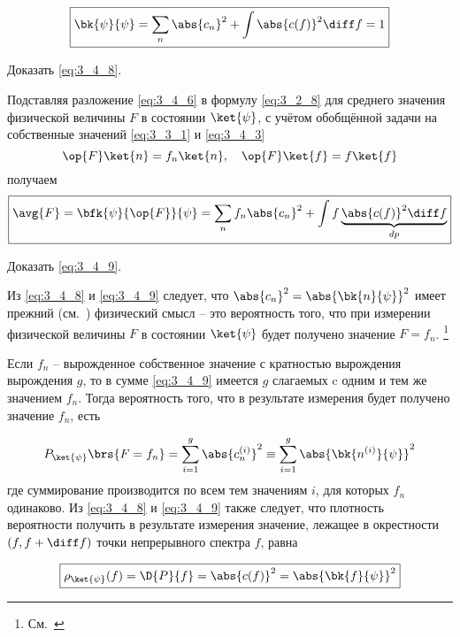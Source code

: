 \begin{equation}
\label{eq:3_4_8}
\boxed {
	\bk{\psi}{\psi} = \sum_n \abs{c_n}^2 + \int \abs{c(f)}^2 \diff f = 1
}
\end{equation}

\begin{excr}
Доказать \eqref{eq:3_4_8}.
\end{excr}


Подставляя разложение \eqref{eq:3_4_6} в формулу \eqref{eq:3_2_8} для среднего значения физической величины $F$ в состоянии $\ket{\psi}$, с учётом обобщённой задачи на собственные значений \eqref{eq:3_3_1} и \eqref{eq:3_4_3}
$$
\op{F} \ket{n} = f_n \ket{n}, ~~~ \op{F} \ket{f} = f \ket{f}
$$%
получаем
\begin{equation}
\label{eq:3_4_9}
\boxed {
	\avg{F} = \bfk{\psi}{\op{F}}{\psi} = \sum_n f_n \abs{c_n}^2 + \int f \underbrace{\abs{c(f)}^2 \diff f}_{dp}
}
\end{equation}

\begin{excr}
Доказать \eqref{eq:3_4_9}.
\end{excr}

Из \eqref{eq:3_4_8} и \eqref{eq:3_4_9} следует, что $\abs{c_n}^2 = \abs{\bk{n}{\psi}}^2$ имеет прежний (см.~) физический смысл -- это вероятность того, что при измерении физической величины $F$ в состоянии $\ket{\psi}$ будет получено значение $F = f_n$. \footnote{См.~}

Если $f_n$ -- вырожденное собственное значение с кратностью вырождения вырождения $g$, то в сумме \eqref{eq:3_4_9} имеется $g$ слагаемых c одним и тем же значением $f_n$. Тогда вероятность того, что в результате измерения будет получено значение $f_n$, есть

\begin{equation}
\label{eq:3_4_10}
P_{\ket{\psi}} \brs{F = f_n} =
  \sum_{i=1}^{g} \abs{c_n^{(i)}}^2 \equiv
  \sum_{i=1}^{g} \abs{ \bk{n^{(i)}}{\psi} }^2
\end{equation}%
%
где суммирование производится по всем тем значениям $i$, для которых $f_n$ одинаково. Из \eqref{eq:3_4_8} и \eqref{eq:3_4_9} также следует, что плотность вероятности получить в результате измерения значение, лежащее в окрестности $(f, f + \diff f)$ точки непрерывного спектра $f$, равна

\begin{equation}
\label{eq:3_4_11}
\boxed {
	\rho_{\ket{\psi}}(f) = \D{P}{f} = \abs{c(f)}^2 = \abs{\bk{f}{\psi}}^2
}
\end{equation}
